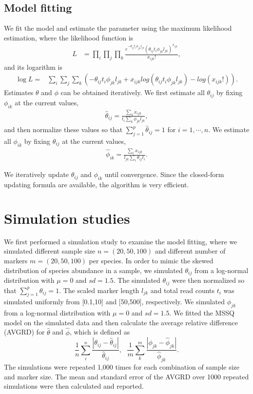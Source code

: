 \subsection{Model fitting}
We fit the model  and estimate the parameter using the maximum likelihood estimation, where the   likelihood   function is
\begin{align*}
L & = \prod_i\prod_j\prod_k \frac{e^{-\theta_{ij}t_{i}\phi_{jk}l_{jk}}(\theta_{ij}t_{i}\phi_{jk}l_{jk})^{x_{ijk}}}{x_{ijk}!},
\end{align*}
and its logarithm is 
\begin{align*}
\log L =  &  
\sum_i\sum_j\sum_k (-\theta_{ij}t_{i}\phi_{jk}l_{jk}+x_{ijk}log(\theta_{ij}t_{i}\phi_{jk}l_{jk})-log(x_{ijk}!)).
\end{align*}
Estimates $\theta$ and $\phi$ can be obtained iteratively.  We  first estimate all $\theta_{ij}$ by fixing  $\phi_{ik}$ at the current values, 
\begin{align*}
\hat \theta_{ij} = \frac{\sum_kx_{ijk}}{t_{i}\sum_k\phi_{jk}l_{jk}}, 
\end{align*}
and then normalize these values so that $\sum_{j=1}^p\hat{\theta}_{ij}=1$ for $i=1,\cdots, n$.
We estimate all $\phi_{ik}$ by fixing  $\theta_{ij}$ at the current values, 
\begin{align*}
\hat \phi_{ik} = \frac{\sum_ix_{ijk}}{l_{jk}\sum_i\theta_{ij}t_{i}}.
\end{align*}

We iteratively update  $\theta_{ij}$ and $\phi_{ik}$ until convergence. Since the closed-form updating formula are available, the algorithm is very efficient. 




\section{Simulation studies}
We  first performed  a simulation study to examine the model fitting, where we simulated different sample size $n=(20,50,100)$ and different number of markers $m=(20,50,100)$ per species. In order to mimic the skewed distribution of species abundance in a sample, we simulated $\theta_{ij}$ from a log-normal distribution with $\mu=0$ and $sd=1.5$. The simulated $\theta_{ij}$ were then normalized so that    $\sum_{j=1}^{p} \theta_{ij} = 1$. The scaled marker length $l_{jk}$ and total read counts $t_i$ was simulated uniformly from [0.1,10] and [50,500], respectively. We simulated $\phi_{jk}$ from a log-normal distribution with $\mu=0$ and $sd= 1.5$. We fitted the MSSQ model on the simulated data and  then calculate the average relative difference (AVGRD) for  $\hat\theta$ and $\hat\phi$, which is defined as
$$\frac{1}{n}\sum_i^n \frac{|\theta_{ij}-\hat{\theta}_{ij}|}{\hat{\theta}_{ij}}, \mbox{  }
\frac{1}{m}\sum_k^m \frac{|\phi_{jk}-\hat{\phi}_{jk}|}{\hat{\phi}_{jk}}.
$$ 
The simulations were repeated 1,000 times for each combination of sample size and marker size. The mean and standard error of the AVGRD over 1000 repeated simulations were then calculated and reported.

